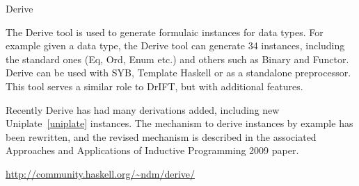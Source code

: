\begin{hcarentry}{Derive}
\label{Derive}
\makeheader

The Derive tool is used to generate formulaic instances for data types. For example given
a data type, the Derive tool can generate 34 instances, including the standard ones
(Eq, Ord, Enum etc.) and others such as Binary and Functor. Derive can be used with SYB,
Template Haskell or as a standalone preprocessor. This tool serves a similar role to DrIFT,
but with additional features.

Recently Derive has had many derivations added, including new Uniplate~\cref{uniplate} instances. The
mechanism to derive instances by example has been rewritten, and the revised mechanism is
described in the associated  Approaches and Applications of Inductive Programming 2009 paper.

\FurtherReading
\url{http://community.haskell.org/~ndm/derive/}
\end{hcarentry}
